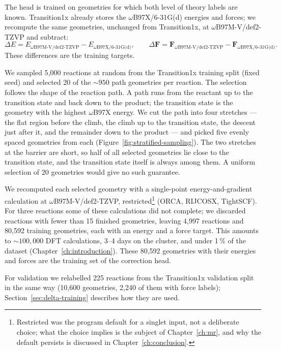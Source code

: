 The head is trained on geometries for which both level of theory labels are known.
Transition1x already stores the $\omega$B97X/6-31G(d) energies and forces;
we recompute the same geometries, unchanged from Transition1x, at
$\omega$B97M-V/def2-TZVP and subtract:
\begin{equation}
  \Delta E = E_{\omega\text{B97M-V/def2-TZVP}} - E_{\omega\text{B97X/6-31G(d)}},
  \qquad
  \Delta \mathbf{F} = \mathbf{F}_{\omega\text{B97M-V/def2-TZVP}} - \mathbf{F}_{\omega\text{B97X/6-31G(d)}}.
\end{equation}
These differences are the training targets.

We sampled 5{,}000 reactions at random from the Transition1x training split
(fixed seed) and selected 20 of the ${\sim}950$ path geometries per reaction.
The selection follows the shape of the reaction path. A path runs from the
reactant up to the transition state and back down to the product; the
transition state is the geometry with the highest $\omega$B97X energy. We
cut the path into four stretches --- the flat region before the climb, the
climb up to the transition state, the descent just after it, and the
remainder down to the product --- and picked five evenly spaced geometries
from each (Figure~\ref{fig:stratified-sampling}). The two stretches at the
barrier are short, so half of all selected geometries lie close to the
transition state, and the transition state itself is always among them. A
uniform selection of 20 geometries would give no such guarantee.

We recomputed each selected geometry with a single-point
energy-and-gradient calculation at $\omega$B97M-V/def2-TZVP,
restricted\footnote{Restricted was the program default for a singlet
input, not a deliberate choice; what the choice implies is the subject
of Chapter~\ref{ch:mr}, and why the default persists is discussed in
Chapter~\ref{ch:conclusion}.} (ORCA, RIJCOSX, TightSCF). For three reactions some of these calculations did not complete; we
discarded reactions with fewer than 15 finished geometries, leaving 4{,}997
reactions and 80{,}592 training geometries, each with an energy and a force
target. This amounts to ${\sim}100{,}000$ DFT calculations, 3--4 days on the
cluster, and under 1\,\% of the dataset (Chapter~\ref{ch:introduction}).
These 80{,}592 geometries with their energies and forces are the
training set of the correction head.

For validation we relabelled 225 reactions from the Transition1x validation
split in the same way (10{,}600 geometries, 2{,}240 of them with force
labels); Section~\ref{sec:delta-training} describes how they are used.

